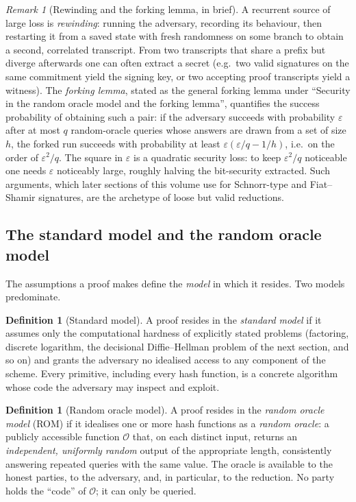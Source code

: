 \documentclass[11pt,a4paper]{article}
\theoremstyle{definition}
\newtheorem{definition}[theorem]{Definition}
\theoremstyle{remark}
\newtheorem{remark}[theorem]{Remark}
\begin{document}
\begin{remark}[Rewinding and the forking lemma, in brief]
\label{model:rem:forking}
A recurrent source of large loss is \emph{rewinding}: running the
adversary, recording its behaviour, then restarting it from a saved
state with fresh randomness on some branch to obtain a second,
correlated transcript. From two transcripts that share a prefix but
diverge afterwards one can often extract a secret (e.g.\ two valid
signatures on the same commitment yield the signing key, or two
accepting proof transcripts yield a witness). The \emph{forking
lemma}, stated as the general forking lemma under ``Security in the
random oracle model and the forking lemma'', quantifies the success
probability of obtaining such a pair: if the adversary succeeds with
probability \(\varepsilon\) after at most \(q\) random-oracle queries
whose answers are drawn from a set of size \(h\), the forked run
succeeds with probability at least \(\varepsilon(\varepsilon/q - 1/h)\),
i.e.\ on the order of \(\varepsilon^2/q\). The square in
\(\varepsilon\) is a quadratic security loss: to keep
\(\varepsilon^2/q\) noticeable one needs \(\varepsilon\) noticeably
large, roughly halving the bit-security extracted. Such arguments,
which later sections of this volume use for Schnorr-type and
Fiat--Shamir signatures, are the archetype of loose but valid
reductions.
\end{remark}

\subsection{The standard model and the random oracle model}
\label{model:subsec:rom}

The assumptions a proof makes define the \emph{model} in which it
resides. Two models predominate.

\begin{definition}[Standard model]\label{model:def:standardmodel}
A proof resides in the \emph{standard model} if it assumes only the
computational hardness of explicitly stated problems (factoring,
discrete logarithm, the decisional Diffie--Hellman problem of the next
section, and so on) and grants the adversary no idealised access to any
component of the scheme. Every primitive, including every hash
function, is a concrete algorithm whose code the adversary may inspect
and exploit.
\end{definition}

\begin{definition}[Random oracle model]\label{model:def:rom}
A proof resides in the \emph{random oracle model} (ROM) if it
idealises one or more hash functions as a \emph{random oracle}: a
publicly accessible function \(\mathcal{O}\) that, on each distinct
input, returns an \emph{independent, uniformly random} output of the
appropriate length, consistently answering repeated queries with the
same value. The oracle is available to the honest parties, to the
adversary, and, in particular, to the reduction. No party holds the
``code'' of \(\mathcal{O}\); it can only be queried.
\end{definition}
\end{document}

